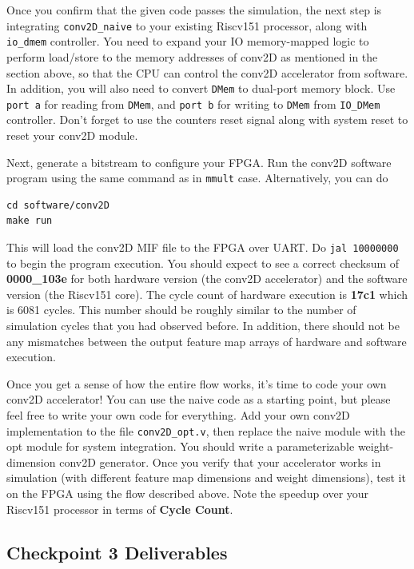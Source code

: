 \documentclass[11pt]{article}
\begin{document}
Once you confirm that the given code passes the simulation, the next step is integrating \texttt{conv2D\_naive} to your existing Riscv151 processor, along with \texttt{io\_dmem} controller. You need to expand your IO memory-mapped logic to perform load/store to the memory addresses of conv2D as mentioned in the section above, so that the CPU can control the conv2D accelerator from software. In addition, you will also need to convert \texttt{DMem} to dual-port memory block. Use \texttt{port a} for reading from \texttt{DMem}, and \texttt{port b} for writing to \texttt{DMem} from \texttt{IO\_DMem} controller. Don't forget to use the counters reset signal along with system reset to reset your conv2D module.

Next, generate a bitstream to configure your FPGA. Run the conv2D software program using the same command as in \texttt{mmult} case. Alternatively, you can do

\begin{verbatim}
cd software/conv2D
make run
\end{verbatim}

This will load the conv2D MIF file to the FPGA over UART. Do \texttt{jal 10000000} to begin the program execution. You should expect to see a correct checksum of \textbf{0000\_103e} for both hardware version (the conv2D accelerator) and the software version (the Riscv151 core). The cycle count of hardware execution is \textbf{17c1} which is 6081 cycles. This number should be roughly similar to the number of simulation cycles that you had observed before. In addition, there should not be any mismatches between the output feature map arrays of hardware and software execution.

Once you get a sense of how the entire flow works, it's time to code your own conv2D accelerator! You can use the naive code as a starting point, but please feel free to write your own code for everything. Add your own conv2D implementation to the file \verb|conv2D_opt.v|, then replace the naive module with the opt module for system integration. You should write a parameterizable weight-dimension conv2D generator. Once you verify that your accelerator works in simulation (with different feature map dimensions and weight dimensions), test it on the FPGA using the flow described above. Note the speedup over your Riscv151 processor in terms of \textbf{Cycle Count}.

\subsection{Checkpoint 3 Deliverables}
\end{document}

